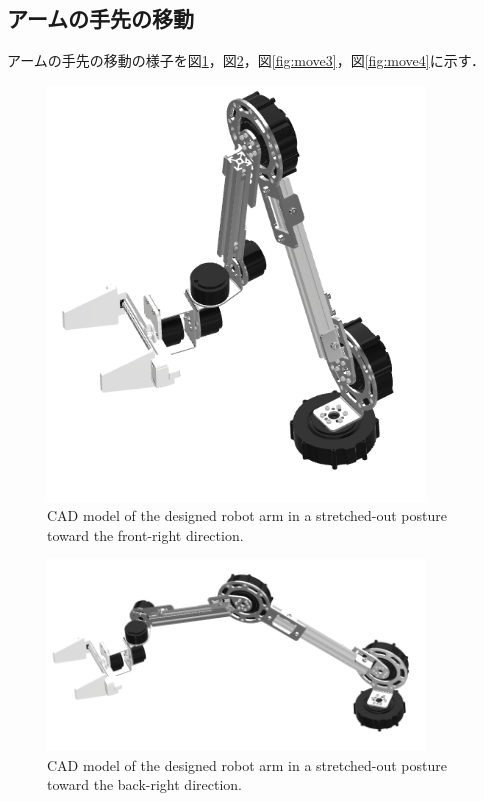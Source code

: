 \subsection{アームの手先の移動}
アームの手先の移動の様子を図\ref{fig:move1}，図\ref{fig:move2}，図\ref{fig:move3}，図\ref{fig:move4}に示す．

\begin{figure}[h]
  \centering
  \includegraphics[width=10cm]{images/design/migitika.png}
  \caption{CAD model of the designed robot arm in a stretched-out posture toward the front-right direction.}
  \label{fig:move1}
\end{figure}

\begin{figure}[h]
  \centering
  \includegraphics[width=10cm]{images/design/migioku.png}
  \caption{CAD model of the designed robot arm in a stretched-out posture toward the back-right direction.}
  \label{fig:move2}
\end{figure}

